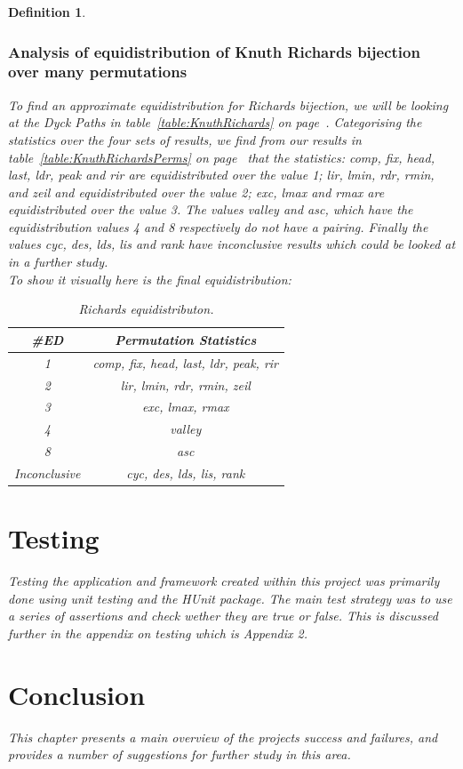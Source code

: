 \documentclass[12pt]{article}
\newtheorem{definition}{Definition}
\begin{document}
\begin{definition}
\subsubsection{Analysis of equidistribution of Knuth Richards bijection over many permutations}
To find an approximate equidistribution for Richards bijection, we will be looking at the Dyck Paths in table~\ref{table:KnuthRichards} on page~\pageref{table:KnuthRichards}. Categorising the statistics over the four sets of results, we find from our results in table~\ref{table:KnuthRichardsPerms} on page~\pageref{table:KnuthRichardsPerms} that the statistics: comp, fix, head, last, ldr, peak and rir are equidistributed over the value 1; lir, lmin, rdr, rmin, and zeil and equidistributed over the value 2; exc, lmax and rmax are equidistributed over the value 3. The values valley and asc, which have the equidistribution values 4 and 8 respectively do not have a pairing. Finally the values cyc, des, lds, lis and rank have inconclusive results which could be looked at in a further study.\\
To show it visually here is the final equidistribution:
\begin{table}[H]
\caption{Richards equidistributon.}
\begin{tabular}{c | c }
\hline\hline
\#ED & Permutation Statistics\\ [0.5ex]
\hline
1 & comp, fix, head, last, ldr, peak, rir\\
\hline
2 & lir, lmin, rdr, rmin, zeil\\
\hline
3 & exc, lmax, rmax\\
\hline
4 & valley\\
\hline
8 & asc\\
\hline
Inconclusive & cyc, des, lds, lis, rank\\
\hline
\end{tabular}
\label{table:FinalEDKnuthRichards}
\end{table}

\section{Testing}
Testing the application and framework created within this project was primarily done using unit testing and the HUnit package. The main test strategy was to use a series of assertions and check wether they are true or false. This is discussed further in the appendix on testing which is Appendix 2.

\section{Conclusion}
This chapter presents a main overview of the projects success and failures, and provides a number of suggestions for further study in this area.


\end{definition}
\end{document}

